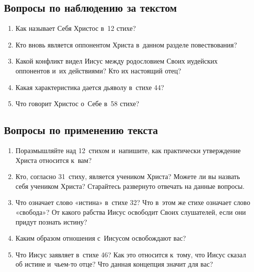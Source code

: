 \documentclass[a4paper,12pt]{article}
\begin{document}
\subsection*{Вопросы по наблюдению за текстом}
\begin{enumerate}
    \item Как называет Себя Христос в~12 стихе? 
    
    \myline
    
    \item Кто вновь является оппонентом Христа в~данном разделе повествования? 
    
    \myline
    
    \myline
    \item Какой конфликт видел Иисус между родословием Своих иудейских оппонентов и~их действиями? Кто их настоящий отец? 
    
    \myline
    
    \myline
    \item Какая характеристика дается дьяволу в~стихе 44? 
    
    \myline
    
    \myline
    \item Что говорит Христос о~Себе в~58 стихе? 
    
    \myline
    
    \myline
\end{enumerate}

\subsection*{Вопросы по применению текста} 
\begin{enumerate}
    \item Поразмышляйте над 12~стихом и~напишите, как практически утверждение Христа относится к~вам?
    
    \myline
    
    \myline
    \item Кто, согласно 31~стиху, является учеником Христа? Можете ли вы назвать себя учеником Христа? Старайтесь развернуто отвечать на данные вопросы. 
    
    \myline
    
    \myline
    \item Что означает слово «истина» в~стихе 32? Что в~этом же стихе означает слово «свобода»? От какого рабства Иисус освободит Своих слушателей, если они придут познать истину? 
    
    \myline
    
    \myline
    \item Каким образом отношения с~Иисусом освобождают вас? 
    
    \myline
    
    \myline
    \item Что Иисус заявляет в~стихе 46? Как это относится к~тому, что Иисус сказал об истине и~чьем-то отце? Что данная концепция значит для вас?
    
    \myline
    
    \myline
\end{enumerate}
\end{document}
